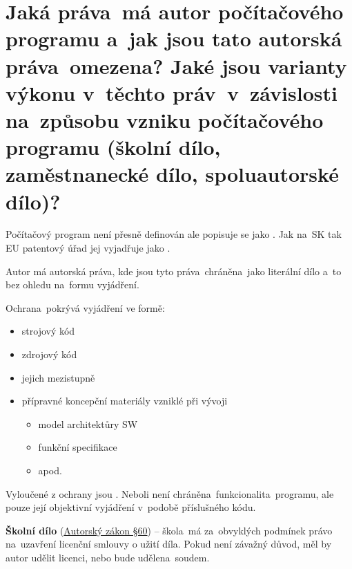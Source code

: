 \section{Jaká práva~má autor počítačového programu a~jak jsou tato autorská práva~omezena? Jaké jsou varianty výkonu v~těchto práv~v~závislosti na~způsobu vzniku počítačového programu (školní dílo, zaměstnanecké dílo, spoluautorské dílo)?}

Počítačový program není přesně definován ale popisuje se jako . Jak na~SK tak EU patentový úřad jej vyjadřuje jako .

Autor má autorská práva, kde jsou tyto práva~chráněna~jako literální dílo a~to bez ohledu na~formu vyjádření.
\newline

\noindent Ochrana~pokrývá vyjádření ve formě:
\begin{itemize}[noitemsep]
    \item strojový kód
    \item zdrojový kód
    \item jejich mezistupně
    \item přípravné koncepční materiály vzniklé při vývoji
    \begin{itemize}[noitemsep]
        \item model architektůry SW
        \item funkční specifikace
        \item apod.
    \end{itemize}
\end{itemize}

Vyloučené z ochrany jsou . Neboli není chráněna~funkcionalita~programu, ale pouze její objektivní vyjádření v~podobě příslušného kódu.

\textbf{Školní dílo} (\href{https://www.zakonyprolidi.cz/cs/2000-121#p60}{Autorský zákon §60}) -- škola~má za~obvyklých podmínek právo na~uzavření licenční smlouvy o užití díla. Pokud není závažný důvod, měl by autor udělit licenci, nebo bude udělena~soudem.

